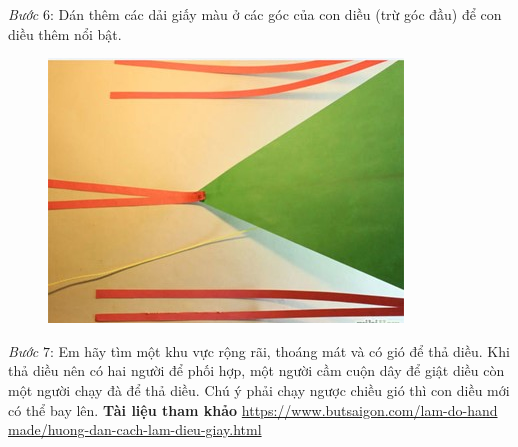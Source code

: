 \begin{multicols}{2}
\begin{figure}[H]
		\vspace*{-10pt}
	\end{figure}
	\textit{Bước} $6$: Dán thêm các dải giấy màu ở các góc của con diều (trừ góc đầu) để con diều thêm nổi bật.
	\begin{figure}[H]
		\vspace*{-5pt}
		\centering
		\captionsetup{labelformat= empty, justification=centering}
		\includegraphics[width= 1\linewidth]{7}
		\vspace*{-10pt}
	\end{figure}
	\textit{Bước} $7$: Em hãy tìm một khu vực rộng rãi, thoáng mát và có gió để thả diều. Khi thả diều nên có hai người để phối hợp, một người cầm cuộn dây để giật diều còn một người chạy đà để thả diều. Chú ý phải chạy ngược chiều gió thì con diều mới có thể bay lên.
	\vskip 0.1cm
	\textbf{\color{toancuabi}Tài liệu tham khảo}
	\vskip 0.1cm
	\url{https://www.butsaigon.com/lam-do-hand}\\
	\url{made/huong-dan-cach-lam-dieu-giay.html}
\end{multicols}
\newpage
\graphicspath{{../toancuabi/pic/}}
\begingroup
